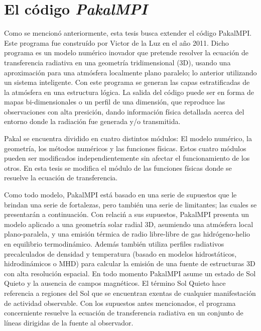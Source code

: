 \documentclass[9pt]{book}
\begin{document}
\section{El c\'odigo \emph{PakalMPI}}
Como se mencion\'o anteriormente, esta tesis busca extender el c\'odigo PakalMPI. Este programa fue constru\'ido por Victor de la Luz en el a\~no 2011\cite{PAKAL}. Dicho programa es un modelo num\'erico inovador que pretende resolver la ecuaci\'on de transferencia radiativa en una geometr\'ia tridimensional (3D), usando una aproximaci\'on para una atm\'osfera localmente plano paralelo; lo anterior utilizando un sistema inteligente. Con este programa se generan las capas estratificadas de la atm\'osfera en una estructura l\'ogica. La salida del c\'odigo puede ser en forma de mapas bi-dimensionales o un perfil de una dimensi\'on, que reproduce las observaciones con alta presici\'on, dando informaci\'on f\'isica detallada acerca del entorno donde la radiaci\'on fue generada y/o transmitida.

Pakal se encuentra dividido en cuatro distintos m\'odulos: El modelo num\'erico, la geometr\'ia, los m\'etodos num\'ericos y las funciones f\'isicas. Estos cuatro m\'odulos pueden ser modificados independientemente sin afectar el funcionamiento de los otros. En esta tesis se modifica el m\'odulo de las funciones f\'isicas donde se resuelve la ecuaci\'on de transferencia.

Como todo modelo, PakalMPI est\'a basado en una serie de supuestos que le brindan una serie de fortalezas, pero tambi\'en una serie de limitantes; las cuales se presentar\'an a continuaci\'on. Con relaci\'n a sus supuestos, PakalMPI presenta un modelo aplicado a una geometr\'ia solar radial 3D, asumiendo una atm\'osfera local plano-paralela, y una emisi\'on t\'ermica de radio libre-libre de gas hidr\'ogeno-helio en equilibrio termodin\'amico. Adem\'as tambi\'en utiliza perfiles radiativos precalculados de densidad y temperatura (basado en modelos hidrost\'aticos, hidrodin\'amicos o MHD) para calcular la emisi\'on de una fuente de estructuras 3D con alta resoluci\'on espacial. En todo momento PakalMPI asume un estado de Sol Quieto y la ausencia de campos magn\'eticos. El t\'ermino Sol Quieto hace referencia a regiones del Sol que se encuentran exentas de cualquier manifestaci\'on de actividad observable. Con los supuestos antes mencionados, el programa concerniente resuelve la ecuaci\'on de transferencia radiativa en un conjunto de l\'ineas dirigidas de la fuente al observador.
\end{document}
